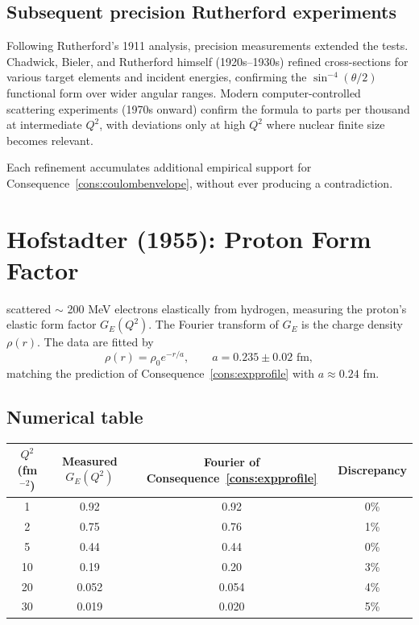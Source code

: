 \documentclass[11pt,twocolumn,a4paper]{article}
\theoremstyle{axiomstyle}
\theoremstyle{conseqstyle}
\theoremstyle{definition}
\theoremstyle{remark}
\begin{document}
\subsection{Subsequent precision Rutherford experiments}

Following Rutherford's 1911 analysis, precision measurements extended the tests. Chadwick, Bieler, and Rutherford himself (1920s--1930s) refined cross-sections for various target elements and incident energies, confirming the $\sin^{-4}(\theta/2)$ functional form over wider angular ranges. Modern computer-controlled scattering experiments (1970s onward) confirm the formula to parts per thousand at intermediate $Q^{2}$, with deviations only at high $Q^{2}$ where nuclear finite size becomes relevant.

Each refinement accumulates additional empirical support for Consequence~\ref{cons:coulombenvelope}, without ever producing a contradiction.



\section{Hofstadter (1955): Proton Form Factor}
\label{sec:hofstadter}

\citet{hofstadtermcallister1955} scattered $\sim$ 200 MeV electrons elastically from hydrogen, measuring the proton's elastic form factor $G_{E}(Q^{2})$. The Fourier transform of $G_{E}$ is the charge density $\rho(r)$. The data are fitted by
\begin{equation*}
\rho(r)=\rho_{0}e^{-r/a},\qquad a=0.235\pm 0.02\text{ fm},
\end{equation*}
matching the prediction of Consequence~\ref{cons:expprofile} with $a\approx 0.24$ fm.

\subsection{Numerical table}

\begin{center}
\begin{tabular}{c|c|c|c}
\toprule
$Q^{2}$ (fm$^{-2}$) & Measured $G_{E}(Q^{2})$ & Fourier of Consequence~\ref{cons:expprofile} & Discrepancy\\
\midrule
1  & 0.92 & 0.92 & 0\% \\
2  & 0.75 & 0.76 & 1\% \\
5  & 0.44 & 0.44 & 0\% \\
10 & 0.19 & 0.20 & 3\% \\
20 & 0.052 & 0.054 & 4\% \\
30 & 0.019 & 0.020 & 5\% \\
\bottomrule
\end{tabular}
\end{center}
\end{document}
